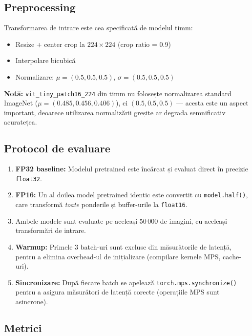 \documentclass[12pt,a4paper]{article}
\begin{document}
\subsection{Preprocessing}

Transformarea de intrare este cea specificată de modelul timm:

\begin{itemize}
  \item Resize + center crop la $224 \times 224$ (crop ratio = 0.9)
  \item Interpolare bicubică
  \item Normalizare: $\mu = (0.5, 0.5, 0.5)$, $\sigma = (0.5, 0.5, 0.5)$
\end{itemize}

\textbf{Notă:} \texttt{vit\_tiny\_patch16\_224} din timm nu folosește
normalizarea standard ImageNet ($\mu = (0.485, 0.456, 0.406)$), ci
$(0.5, 0.5, 0.5)$ --- acesta este un aspect important, deoarece utilizarea
normalizării greșite ar degrada semnificativ acuratețea.

\subsection{Protocol de evaluare}

\begin{enumerate}
  \item \textbf{FP32 baseline:} Modelul pretrained este încărcat și evaluat
    direct în precizie \texttt{float32}.
  \item \textbf{FP16:} Un al doilea model pretrained identic este convertit
    cu \texttt{model.half()}, care transformă \emph{toate} ponderile și
    buffer-urile la \texttt{float16}.
  \item Ambele modele sunt evaluate pe aceleași 50\,000 de imagini,
    cu aceleași transformări de intrare.
  \item \textbf{Warmup:} Primele 3 batch-uri sunt excluse din măsurătorile
    de latență, pentru a elimina overhead-ul de inițializare (compilare
    kernele MPS, cache-uri).
  \item \textbf{Sincronizare:} După fiecare batch se apelează
    \texttt{torch.mps.synchronize()} pentru a asigura măsurători de latență
    corecte (operațiile MPS sunt asincrone).
\end{enumerate}

\subsection{Metrici}
\end{document}
